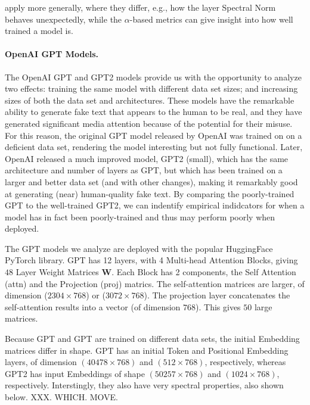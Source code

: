 apply more generally, where they differ, e.g., how the layer Spectral Norm behaves unexpectedly, while the $\alpha$-based metrics can give insight into how well trained a model is.


\paragraph{OpenAI GPT Models.}

The OpenAI GPT and GPT2 models provide us with the opportunity to analyze two effects: training the same model with different data set sizes; and increasing sizes of both the data set and architectures.
These models have the remarkable ability to generate fake text that appears to the human to be real, and they have generated significant media attention because of the potential for their misuse.
For this reason, the original GPT model released by OpenAI was trained on on a deficient data set, rendering the model interesting but not fully functional.  
Later, OpenAI released a much improved model, GPT2 (small), which has the same architecture and number of layers as GPT, but which has been trained on a larger and better data set (and with other changes), making it remarkably good at generating (near) human-quality fake text.  
%
By comparing the poorly-trained GPT to the well-trained GPT2, we can indentify empirical indidcators for when a model has in fact been poorly-trained and thus may perform poorly when deployed.

The GPT models we analyze are deployed with the popular HuggingFace PyTorch library.
GPT has 12 layers, with 4 Multi-head Attention Blocks, giving $48$ Layer Weight Matrices $\mathbf{W}$.
Each Block has 2 components, the Self Attention (attn) and the Projection (proj) matrics.  
The self-attention  matrices are larger, of dimension ($2304\times 768$) or ($3072\times 768$).
The projection layer concatenates the self-attention results into a vector (of dimension $768$).
This gives $50$ large matrices.

Because GPT and GPT are trained on different data sets, the initial Embedding matrices differ in shape.
GPT  has an initial Token and Positional Embedding layers, of dimension $(40478\times 768)$ and $(512\times 768)$, respectively, whereas GPT2 has input Embeddings of shape $(50257\times 768)$ and $(1024\times 768)$, respectively. 
Interstingly, they also have very spectral properties, also shown below. XXX.  WHICH.  MOVE.

